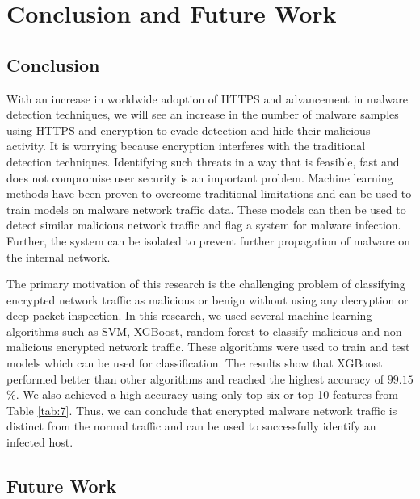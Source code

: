 \chapter{Conclusion and Future Work\label{chap:conclusion}}

\section{Conclusion}

With an increase in worldwide adoption of HTTPS and advancement in malware detection techniques, we will see an increase in the number of malware samples using HTTPS and encryption to evade detection and hide their malicious activity. It is worrying because encryption interferes with the traditional detection techniques. Identifying such threats in a way that is feasible, fast and does not compromise user security is an important problem. Machine learning methods have been proven to overcome traditional limitations and can be used to train models on malware network traffic data. These models can then be used to detect similar malicious network traffic and flag a system for malware infection. Further, the system can be isolated to prevent further propagation of malware on the internal network.

The primary motivation of this research is the challenging problem of classifying encrypted network traffic as malicious or benign without using any decryption or deep packet inspection. In this research, we used several machine learning algorithms such as SVM, XGBoost, random forest to classify malicious and non-malicious encrypted network traffic. These algorithms were used to train and test models which can be used for classification. The results show that XGBoost performed better than other algorithms and reached the highest accuracy of $99.15$\%. We also achieved a high accuracy using only top six or top 10 features from Table \ref{tab:7}. Thus, we can conclude that encrypted malware network traffic is distinct from the normal traffic and can be used to successfully identify an infected host.

\section{Future Work}

